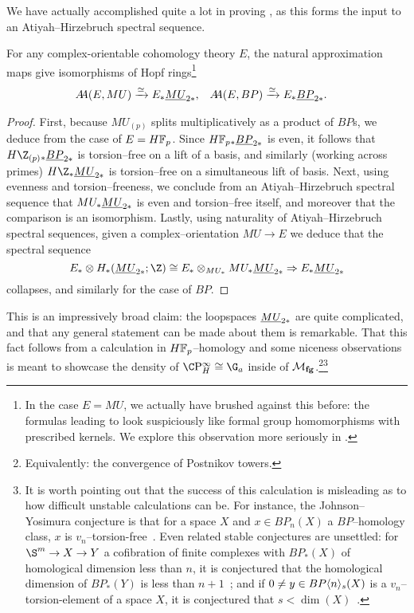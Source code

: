 We have actually accomplished quite a lot in proving , as this forms the input to an Atiyah--Hirzebruch spectral sequence.

\begin{corollary}\label{HopfRingForEBP}
For any complex-orientable cohomology theory \(E\), the natural approximation maps give isomorphisms of Hopf rings\footnote{In the case \(E = MU\), we actually have brushed against this before: the formulas leading to  look suspiciously like formal group homomorphisms with prescribed kernels.  We explore this observation more seriously in .}
\begin{align*}
A\!\!A(E, MU)  & \xrightarrow{\simeq} E_* \underline{\smash{MU}}_{2*}, &
A\!\!A(E, BP) & \xrightarrow{\simeq} E_* \underline{\smash{BP}}_{2*}.
\end{align*}
\end{corollary}
\begin{proof}
First, because \(MU_{(p)}\) splits multiplicatively as a product of \(BP\)s, we deduce from  the case of \(E = \HFp\).  Since \(\HFp_* \OS{BP}{2*}\) is even, it follows that \(H\Z_{(p)}{}_* \OS{BP}{2*}\) is torsion--free on a lift of a basis, and similarly (working across primes) \(H\Z_* \OS{MU}{2*}\) is torsion--free on a simultaneous lift of basis.  Next, using evenness and torsion--freeness, we conclude from an Atiyah--Hirzebruch spectral sequence that \(MU_* \underline{\smash{MU}}_{2*}\) is even and torsion--free itself, and moreover that the comparison is an isomorphism.  Lastly, using naturality of Atiyah--Hirzebruch spectral sequences, given a complex--orientation \(MU \to E\) we deduce that the spectral sequence \[E_* \otimes H_*(\OS{MU}{2*}; \Z) \cong E_* \otimes_{MU_*} MU_* \OS{MU}{2*} \Rightarrow E_* \OS{MU}{2*}\] collapses, and similarly for the case of \(BP\).
\end{proof}

This is an impressively broad claim: the loopspaces \(\underline{\smash{MU}}_{2*}\) are quite complicated, and that any general statement can be made about them is remarkable.  That this fact follows from a calculation in \(\HFp\)--homology and some niceness observations is meant to showcase the density of \(\CP^\infty_H \cong \G_a\) inside of \(\mathcal{M}_{\mathbf{fg}}\).\footnote{Equivalently: the convergence of Postnikov towers.}\footnote{It is worth pointing out that the success of this calculation is misleading as to how difficult unstable calculations can be.  For instance, the Johnson--Yosimura conjecture is that for a space \(X\) and \(x \in BP_n(X)\) a \(BP\)--homology class, \(x\) is \(v_n\)--torsion-free~\cite[pg.\ 37]{Wilson}.  Even related stable conjectures are unsettled: for \(\S^m \to X \to Y\) a cofibration of finite complexes with \(BP_*(X)\) of homological dimension less than \(n\), it is conjectured that the homological dimension of \(BP_*(Y)\) is less than \(n+1\)~\cite[Conjecture 6.8]{JohnsonWilsonProjDim}; and if \(0 \ne y \in BP\langle n\rangle_s(X)\) is a \(v_n\)--torsion-element of a space $X$, it is conjectured that \(s < \dim(X)\)~\cite[Question 6.11]{JohnsonWilsonProjDim}.}

